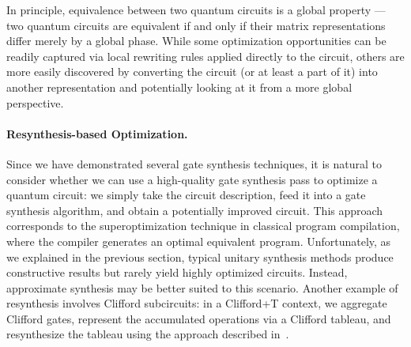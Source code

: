 \documentclass[a4paper,onecolumn,11pt,unpublished]{quantumarticle}
\begin{document}
In principle, equivalence between two quantum circuits is a global property --- two quantum circuits are equivalent if and only if their matrix representations differ merely by a global phase. While some optimization opportunities can be readily captured via local rewriting rules applied directly to the circuit, others are more easily discovered by converting the circuit (or at least a part of it) into another representation and potentially looking at it from a more global perspective.


\paragraph{Resynthesis-based Optimization.} Since we have demonstrated several gate synthesis techniques, it is natural to consider whether we can use a high-quality gate synthesis pass to optimize a quantum circuit: we simply take the circuit description, feed it into a gate synthesis algorithm, and obtain a potentially improved circuit. This approach corresponds to the superoptimization technique in classical program compilation, where the compiler generates an optimal equivalent program. Unfortunately, as we explained in the previous section, typical unitary synthesis methods produce constructive results but rarely yield highly optimized circuits. Instead, approximate synthesis may be better suited to this scenario. Another example of resynthesis involves Clifford subcircuits: in a Clifford+T context, we aggregate Clifford gates, represent the accumulated operations via a Clifford tableau, and resynthesize the tableau using the approach described in~.
\end{document}
